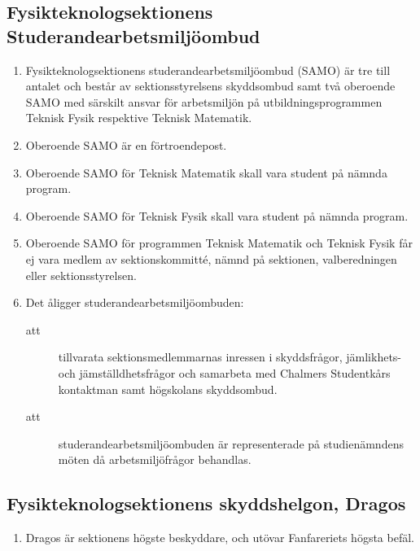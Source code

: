 \documentclass[11pt,a4paper]{article}
\begin{document}
\subsection{Fysikteknologsektionens Studerandearbetsmiljöombud}

\begin{enumerate}[\thesubsection .1]

  \item Fysikteknologsektionens studerandearbetsmiljöombud (SAMO) är tre till
  antal\-et och består av sektionsstyrelsens skyddsombud samt två oberoende SAMO med
  särskilt ansvar för arbetsmiljön på utbildningsprogrammen Teknisk
  Fysik respektive Teknisk Matematik.
  
  \item Oberoende SAMO är en förtroendepost.
  
\item Oberoende SAMO för Teknisk Matematik skall vara student på nämnda program.

\item Oberoende SAMO för Teknisk Fysik skall vara student på nämnda program.

\item Oberoende SAMO för programmen Teknisk Matematik och Teknisk Fysik får ej vara medlem av sektionskommitté, nämnd på sektionen, valberedningen eller sektionsstyrelsen.

  \item Det åligger studerandearbetsmiljöombuden:
    \begin{description}
      \item[att] tillvarata sektionsmedlemmarnas inressen i
      skyddsfrågor, jäm\-lik\-hets- och jämställdhetsfrågor och samarbeta
      med Chalmers Studentkårs kontaktman samt högskolans skyddsombud.
      \item[att] studerandearbetsmiljöombuden är representerade på
      studienämndens möten då arbetsmiljöfrågor behandlas.
    \end{description}

\end{enumerate}

\subsection{Fysikteknologsektionens skyddshelgon, Dragos}

\begin{enumerate}[\thesubsection .1]
  \item Dragos är sektionens högste beskyddare, och utövar Fanfareriets hög\-sta befäl.
\end{enumerate}
\end{document}

